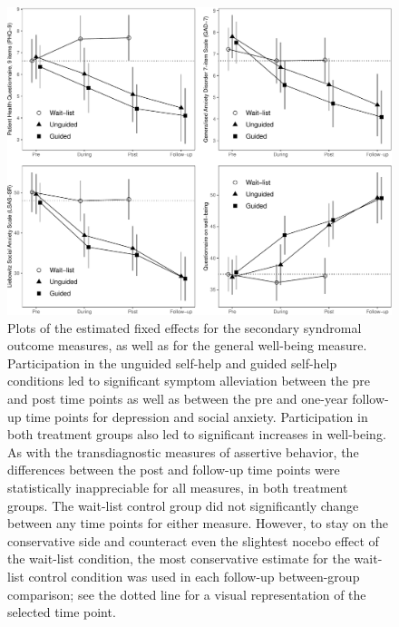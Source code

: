 \documentclass[preprint,
3p]{elsarticle} %
\begin{document}
\begin{figure}
\includegraphics[width=1\linewidth]{r2fu-article_files/figure-latex/emm.secondary.plots-1} \caption{Plots of the estimated fixed effects for the secondary syndromal outcome measures, as well as for the general well-being measure. Participation in the unguided self-help and guided self-help conditions led to significant symptom alleviation between the pre and post time points as well as between the pre and one-year follow-up time points for depression and social anxiety. Participation in both treatment groups also led to significant increases in well-being. As with the transdiagnostic measures of assertive behavior, the differences between the post and follow-up time points were statistically inappreciable for all measures, in both treatment groups. The wait-list control group did not significantly change between any time points for either measure. However, to stay on the conservative side and counteract even the slightest nocebo effect of the wait-list condition, the most conservative estimate for the wait-list control condition was used in each follow-up between-group comparison; see the dotted line for a visual representation of the selected time point.}\label{fig:emm.secondary.plots}
\end{figure}
\end{document}
